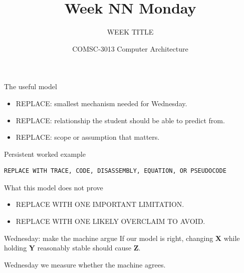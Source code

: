 \documentclass{beamer}
\title{Week NN Monday}
\subtitle{WEEK TITLE}
\author{COMSC-3013 Computer Architecture}
\date{}
\begin{document}
\begin{frame}
  \titlepage
\end{frame}


\begin{frame}{The useful model}
\begin{itemize}
  \item REPLACE: smallest mechanism needed for Wednesday.
  \item REPLACE: relationship the student should be able to predict from.
  \item REPLACE: scope or assumption that matters.
\end{itemize}
\end{frame}

\begin{frame}[fragile]{Persistent worked example}
\begin{lstlisting}
REPLACE WITH TRACE, CODE, DISASSEMBLY, EQUATION, OR PSEUDOCODE
\end{lstlisting}
\end{frame}

\begin{frame}{What this model does not prove}
\begin{itemize}
  \item REPLACE WITH ONE IMPORTANT LIMITATION.
  \item REPLACE WITH ONE LIKELY OVERCLAIM TO AVOID.
\end{itemize}
\end{frame}

\begin{frame}{Wednesday: make the machine argue}
\Large
If our model is right, changing \textbf{X} while holding \textbf{Y} reasonably stable should cause \textbf{Z}.

\vspace{1em}
\normalsize
Wednesday we measure whether the machine agrees.
\end{frame}
\end{document}
